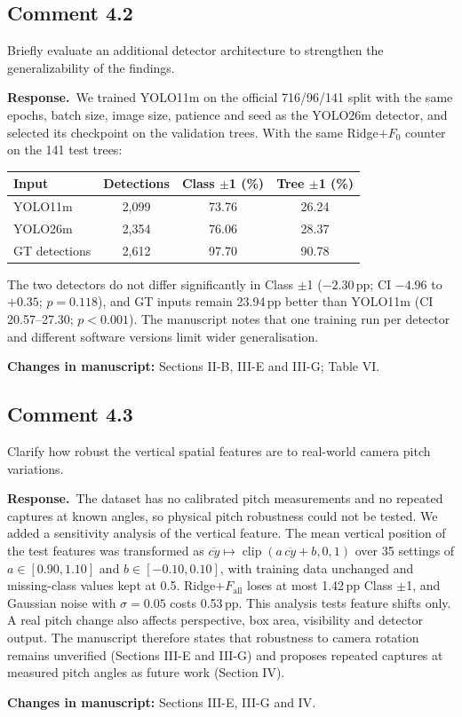 \documentclass[10pt,a4paper]{article}
\newcommand{\resp}{\textbf{Response.}\ }
\newcommand{\changes}[1]{\par\textbf{Changes in manuscript:} #1}
\newcommand{\Fall}{F_{\text{all}}}
\newcommand{\pp}{\,pp}
\begin{document}
\subsection{Comment 4.2}
\begin{cmt}
Briefly evaluate an additional detector architecture to strengthen the generalizability
of the findings.
\end{cmt}
\resp We trained YOLO11m on the official 716/96/141 split with the same epochs, batch
size, image size, patience and seed as the YOLO26m detector, and selected its checkpoint
on the validation trees. With the same Ridge$+F_0$ counter on the 141 test trees:

\begin{center}
\small
\begin{tabular}{@{}lccc@{}}
\toprule
Input & Detections & Class $\pm$1 (\%) & Tree $\pm$1 (\%) \\
\midrule
YOLO11m & 2,099 & 73.76 & 26.24 \\
YOLO26m & 2,354 & 76.06 & 28.37 \\
GT detections & 2,612 & 97.70 & 90.78 \\
\bottomrule
\end{tabular}
\end{center}

The two detectors do not differ significantly in Class $\pm$1 ($-2.30$\pp; CI $-4.96$ to
$+0.35$; $p=0.118$), and GT inputs remain 23.94\pp{} better than YOLO11m (CI
20.57--27.30; $p<0.001$). The manuscript notes that one training run per detector and
different software versions limit wider generalisation.
\changes{Sections II-B, III-E and III-G; Table VI.}

\subsection{Comment 4.3}
\begin{cmt}
Clarify how robust the vertical spatial features are to real-world camera pitch
variations.
\end{cmt}
\resp The dataset has no calibrated pitch measurements and no repeated captures at known
angles, so physical pitch robustness could not be tested. We added a sensitivity analysis
of the vertical feature. The mean vertical position of the test features was transformed
as $\overline{cy}\mapsto\operatorname{clip}(a\,\overline{cy}+b,0,1)$ over 35 settings of
$a\in[0.90,1.10]$ and $b\in[-0.10,0.10]$, with training data unchanged and missing-class
values kept at 0.5. Ridge$+\Fall$ loses at most 1.42\pp{} Class $\pm$1, and Gaussian noise
with $\sigma=0.05$ costs 0.53\pp. This analysis tests feature shifts only. A real pitch
change also affects perspective, box area, visibility and detector output. The manuscript
therefore states that robustness to camera rotation remains unverified
(Sections III-E and III-G) and proposes repeated captures at measured pitch angles as
future work (Section IV).
\changes{Sections III-E, III-G and IV.}
\end{document}
